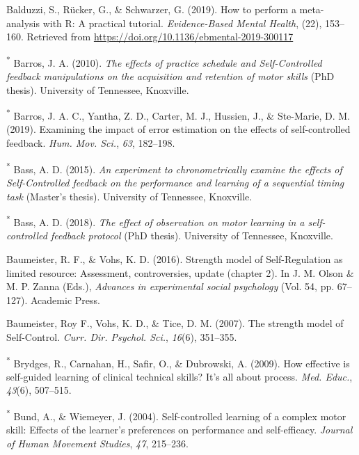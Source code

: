 \documentclass[
  english,
  man,floatsintext]{apa7}
\newlength{\cslhangindent}
\newlength{\cslentryspacingunit} %
\newenvironment{CSLReferences}[2] %
 {%
  \setlength{\parindent}{0pt}
  \ifodd #1
  \let\oldpar\par
  \def\par{\hangindent=\cslhangindent\oldpar}
  \fi
  \setlength{\parskip}{#2\cslentryspacingunit}
 }%
 {}
\begin{document}
\begin{CSLReferences}{1}{0}
\leavevmode{}%
Balduzzi, S., Rücker, G., \& Schwarzer, G. (2019). How to perform a meta-analysis with {R}: A practical tutorial. \emph{Evidence-Based Mental Health}, (22), 153--160. Retrieved from \url{https://doi.org/10.1136/ebmental-2019-300117}

\leavevmode{}%
\textsuperscript{*} Barros, J. A. (2010). \emph{The effects of practice schedule and {Self-Controlled} feedback manipulations on the acquisition and retention of motor skills} (PhD thesis). University of Tennessee, Knoxville.

\leavevmode{}%
\textsuperscript{*} Barros, J. A. C., Yantha, Z. D., Carter, M. J., Hussien, J., \& Ste-Marie, D. M. (2019). Examining the impact of error estimation on the effects of self-controlled feedback. \emph{Hum. Mov. Sci.}, \emph{63}, 182--198.

\leavevmode{}%
\textsuperscript{*} Bass, A. D. (2015). \emph{An experiment to chronometrically examine the effects of {Self-Controlled} feedback on the performance and learning of a sequential timing task} (Master's thesis). University of Tennessee, Knoxville.

\leavevmode{}%
\textsuperscript{*} Bass, A. D. (2018). \emph{The effect of observation on motor learning in a self-controlled feedback protocol} (PhD thesis). University of Tennessee, Knoxville.

\leavevmode{}%
Baumeister, R. F., \& Vohs, K. D. (2016). Strength model of {Self-Regulation} as limited resource: Assessment, controversies, update (chapter 2). In J. M. Olson \& M. P. Zanna (Eds.), \emph{Advances in experimental social psychology} (Vol. 54, pp. 67--127). Academic Press.

\leavevmode{}%
Baumeister, Roy F., Vohs, K. D., \& Tice, D. M. (2007). The strength model of {Self-Control}. \emph{Curr. Dir. Psychol. Sci.}, \emph{16}(6), 351--355.

\leavevmode{}%
\textsuperscript{*} Brydges, R., Carnahan, H., Safir, O., \& Dubrowski, A. (2009). How effective is self-guided learning of clinical technical skills? It's all about process. \emph{Med. Educ.}, \emph{43}(6), 507--515.

\leavevmode{}%
\textsuperscript{*} Bund, A., \& Wiemeyer, J. (2004). Self-controlled learning of a complex motor skill: Effects of the learner's preferences on performance and self-efficacy. \emph{Journal of Human Movement Studies}, \emph{47}, 215--236.


\end{CSLReferences}
\end{document}
